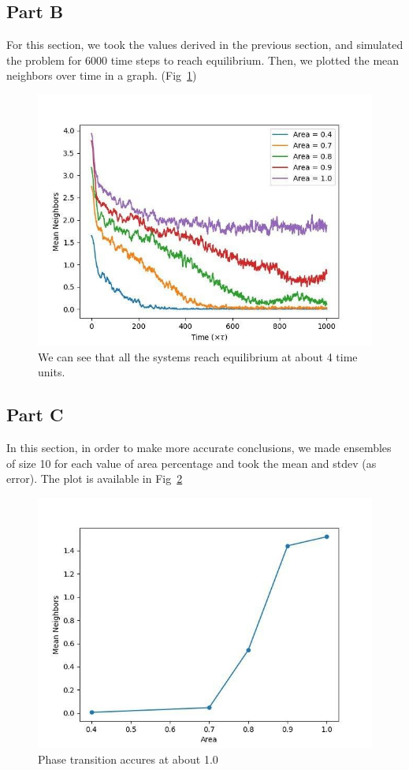 \documentclass[12pt, a4paper]{article}
\begin{document}
	\subsection{Part B}
	For this section, we took the values derived in the previous section, and simulated the problem for 6000 time steps to reach equilibrium. Then,
	we plotted the mean neighbors over time in a graph. (Fig~\ref{fig:mean_neighbors})
	
	\begin{figure}[h!]
		\centering
		\includegraphics[width=.8\linewidth]{../p3/results/mean_neighbors.jpg}
		\caption{We can see that all the systems reach equilibrium at about 4 time units.}
		\label{fig:mean_neighbors}
	\end{figure}
	
	\subsection{Part C}
	In this section, in order to make more accurate conclusions, we made ensembles of size 10 for each value of area percentage and took the mean
	and stdev (as error). The plot is available in Fig~\ref{fig:eq_mean_neighbors}
	
	\begin{figure}[h!]
		\centering
		\includegraphics[width=.8\linewidth]{../p3/results/eq_mean_neighbors.jpg}
		\caption{Phase transition accures at about 1.0}
		\label{fig:eq_mean_neighbors}
	\end{figure}
\end{document}
